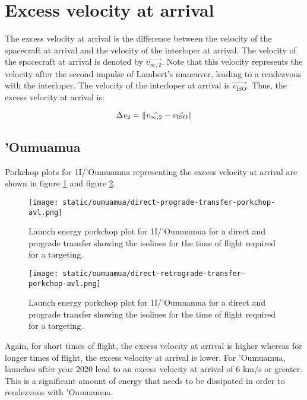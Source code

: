 \section{Excess velocity at arrival}

The excess velocity at arrival is the difference between the velocity of the
spacecraft at arrival and the velocity of the interloper at arrival. The
velocity of the spacecraft at arrival is denoted by $\vec{v_{\infty ,2}}$. Note
that this velocity represents the velocity after the second impulse of Lambert's
maneuver, leading to a rendezvous with the interloper. The velocity of the
interloper at arrival is $\vec{v_\text{ISO}}$. Thus, the excess velocity at
arrival is:

\begin{equation}
    \Delta v_2 = \lVert\vec{v_{\infty ,2}} - \vec{v_\text{ISO}}\rVert
\end{equation}


\subsection{'Oumuamua}

Porkchop plots for 1I/'Oumuamua representing the excess velocity at arrival are
shown in figure \ref{fig:oumuamua-direct-prograde-transfer-porkchop-avl} and figure
\ref{fig:oumuamua-direct-retrograde-transfer-porkchop-avl}.

\begin{figure}[H]
  \centering
  \texttt{[image: static/oumuamua/direct-prograde-transfer-porkchop-avl.png]}
        \caption[Direct and prograde launch energy porkchop for 'Oumuamua]{Launch energy porkchop plot for 1I/'Oumuamua for a direct and prograde
        transfer showing the isolines for
        the time of flight required for a targeting.}
  \label{fig:oumuamua-direct-prograde-transfer-porkchop-avl}
\end{figure}

\begin{figure}[H]
  \centering
  \texttt{[image: static/oumuamua/direct-retrograde-transfer-porkchop-avl.png]}
        \caption[Direct and prograde launch energy porkchop for 'Oumuamua]{Launch energy porkchop plot for 1I/'Oumuamua for a direct and prograde
        transfer showing the isolines for
        the time of flight required for a targeting.}
  \label{fig:oumuamua-direct-retrograde-transfer-porkchop-avl}
\end{figure}

Again, for short times of flight, the excess velocity at arrival is higher
whereas for longer times of flight, the excess velocity at arrival is lower.
For 'Oumuamua, launches after year 2020 lead to an excess velocity at arrival of
$6 \text{ km/s}$ or greater. This is a significant amount of energy that needs to
be dissipated in order to rendezvous with 'Oumuamua.


